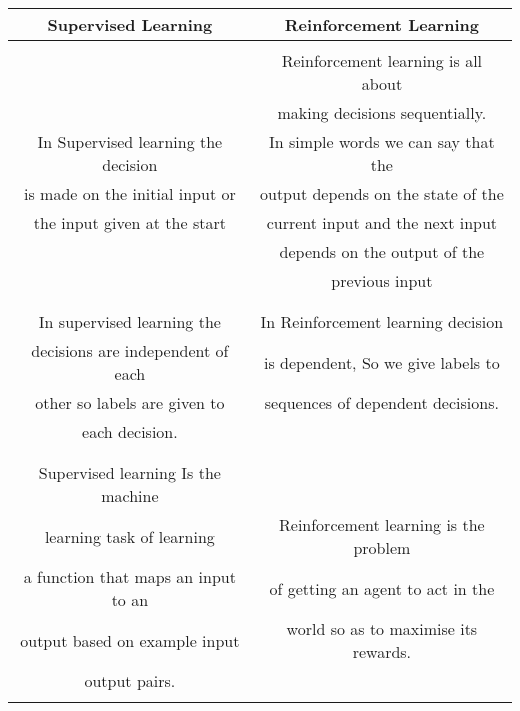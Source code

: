 \begin{center}
 \begin{tabular}{| c | c |} 
 \hline
 \textbf{Supervised Learning} & \textbf{Reinforcement Learning}  \\ [0.5ex] 
 \hline
                                     &                                      \\
                                     &  Reinforcement learning is all about \\
                                     &  making decisions sequentially. \\ 
 In Supervised learning the decision &  In simple words we can say that the \\
is made on the initial input or      &  output depends on the state of the \\
the input given at the start         &  current input and the next input \\
                                     &  depends on the output of the  \\
                                     &  previous input \\
                                     &                                      \\
 \hline
                                     &   \\
 In supervised learning the          & In Reinforcement learning decision \\
 decisions are independent of each   & is dependent, So we give labels to \\
 other so labels are given to        & sequences of dependent decisions.  \\
 each decision.                      & \\
                                     & \\
 \hline
                                     &      \\
 Supervised learning Is the machine  &      \\
 learning task of learning           & Reinforcement learning is the problem\\
 a function that maps an input to an & of getting an agent to act in the \\
 output based on example input       & world so as to maximise its rewards. \\
 output pairs.                       &  \\
                                     &      \\

\end{tabular}
\end{center}
